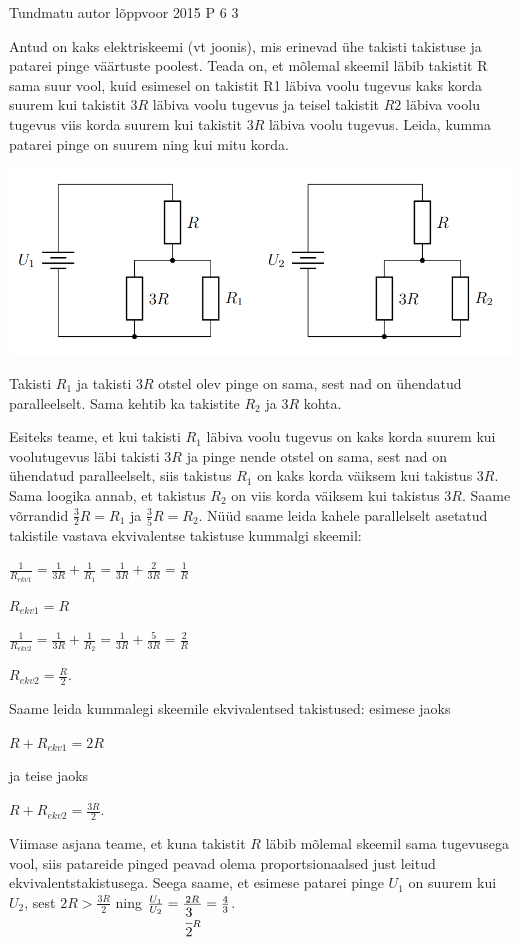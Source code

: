 {Tundmatu autor} %
{lõppvoor} %
{2015} %
{P 6} %
{3} %
{

\ifStatement
Antud on kaks elektriskeemi (vt joonis), mis erinevad ühe takisti takistuse ja patarei pinge väärtuste poolest. Teada on, et mõlemal skeemil läbib takistit R sama suur vool, kuid esimesel on takistit R1 läbiva voolu tugevus kaks korda suurem kui takistit $3R$ läbiva voolu tugevus ja teisel takistit $R2$ läbiva voolu tugevus viis korda suurem kui takistit $3R$ läbiva voolu tugevus. Leida, kumma patarei pinge on suurem ning kui mitu korda.
\begin{center}
	\includegraphics[width=0.5\linewidth]{2015-v3p-06-yl.png}
\end{center}
\fi

\ifHint
Takisti $R_1$ ja takisti $3R$ otstel olev pinge on sama, sest nad on ühendatud paralleelselt. Sama kehtib ka takistite $R_2$ ja $3R$ kohta.
\fi

\ifSolution
Esiteks teame, et kui takisti $R_1$ läbiva voolu tugevus on kaks korda suurem kui voolutugevus läbi takisti $3R$ ja pinge nende otstel on sama, sest nad on ühendatud paralleelselt, siis takistus $R_1$ on kaks korda väiksem kui takistus $3R$. Sama loogika annab, et takistus $R_2$ on viis korda väiksem kui takistus $3R$. Saame võrrandid $\frac{3}{2}R = R_1$ ja $\frac{3}{5}R = R_2$. Nüüd saame leida kahele parallelselt asetatud takistile vastava ekvivalentse takistuse kummalgi skeemil:
\begin{center}
$\frac{1}{R_{ekv1}} = \frac{1}{3R} + \frac{1}{R_1} = \frac{1}{3R} + \frac{2}{3R} = \frac{1}{R}$
\end{center}
\begin{center}
$R_{ekv1} = R$
\end{center}
\begin{center}
$\frac{1}{R_{ekv2}} = \frac{1}{3R} + \frac{1}{R_2} = \frac{1}{3R} + \frac{5}{3R} = \frac{2}{R}$
\end{center}
\begin{center}
${R_{ekv2}} = \frac{R}{2}$.
\end{center}
Saame leida kummalegi skeemile ekvivalentsed takistused: esimese jaoks
\begin{center}
$R + R_{ekv1} = 2R$
\end{center}
ja teise jaoks
\begin{center}
$R + R_{ekv2} = \frac{3R}{2}$.
\end{center}
Viimase asjana teame, et kuna takistit $R$ läbib mõlemal skeemil sama tugevusega vool, siis patareide pinged peavad olema proportsionaalsed just leitud ekvivalentstakistusega. Seega saame, et esimese patarei pinge $U_1$ on suurem kui $U_2$, sest $2R > \frac{3R}{2}$ ning $\frac{U_1}{U_2} = \frac{2R}{\cfrac{3}{2}R} = \frac{4}{3}$.
\fi
}
